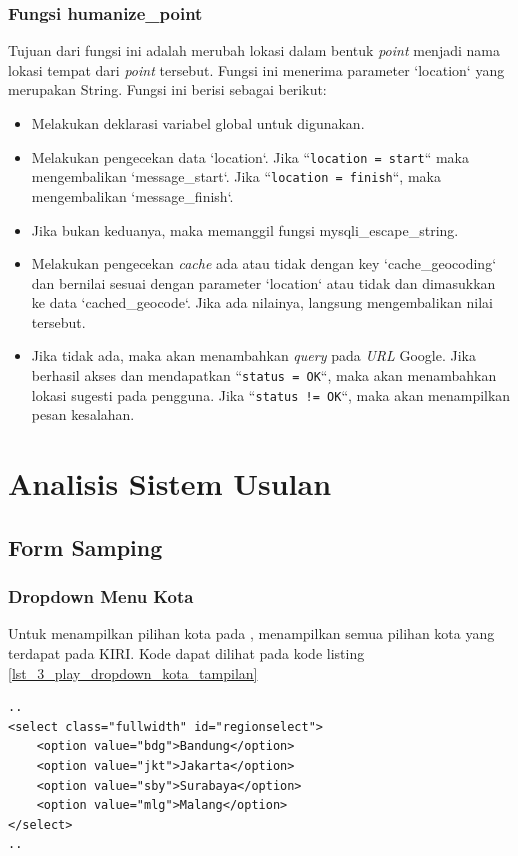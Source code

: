 \subsubsection{Fungsi humanize\_point}
Tujuan dari fungsi ini adalah merubah lokasi dalam bentuk \textit{point} menjadi nama lokasi tempat dari \textit{point} tersebut. Fungsi ini menerima parameter `location` yang merupakan String. Fungsi ini berisi sebagai berikut:
\begin{itemize}
	\item Melakukan deklarasi variabel global untuk digunakan.
	\item Melakukan pengecekan data `location`. Jika ``\texttt{location = start}`` maka mengembalikan `message\_start`. Jika ``\texttt{location = finish}``, maka mengembalikan `message\_finish`.
	\item Jika bukan keduanya, maka memanggil fungsi mysqli\_escape\_string.
	\item Melakukan pengecekan \textit{cache} ada atau tidak dengan key `cache\_geocoding` dan bernilai sesuai dengan parameter `location` atau tidak dan dimasukkan ke data `cached\_geocode`. Jika ada nilainya, langsung mengembalikan nilai tersebut.
	\item Jika tidak ada, maka akan menambahkan \textit{query} pada \textit{URL} Google. Jika berhasil akses dan mendapatkan ``\texttt{status = OK}``, maka akan menambahkan lokasi sugesti pada pengguna. Jika ``\texttt{status != OK}``, maka akan menampilkan pesan kesalahan. 
\end{itemize}
\section{Analisis Sistem Usulan}
\label{sec:perubahan}

\subsection{Form Samping}
\subsubsection{Dropdown Menu Kota}
Untuk menampilkan pilihan kota pada \play, menampilkan semua pilihan kota yang terdapat pada KIRI. Kode dapat dilihat pada kode listing \ref{lst_3_play_dropdown_kota_tampilan}

\begin{lstlisting}[caption=Menampilkan pilihan kota kepada pengguna ,label = {lst_3_play_dropdown_kota_tampilan}]
..
<select class="fullwidth" id="regionselect">
    <option value="bdg">Bandung</option>
    <option value="jkt">Jakarta</option>
    <option value="sby">Surabaya</option>
    <option value="mlg">Malang</option>
</select>
..
\end{lstlisting}

